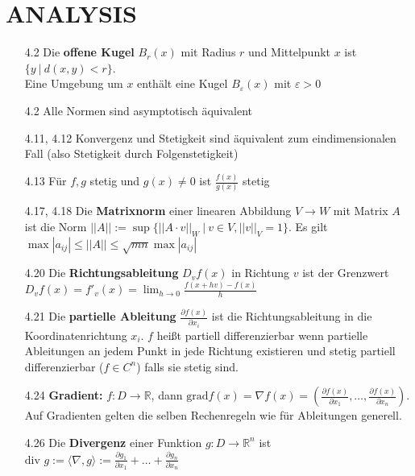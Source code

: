 \documentclass{scrartcl}
\begin{document}
\section*{ANALYSIS}

\begin{itemize}
    \item [4.2] Die \textbf{offene Kugel} $B_r(x)$ mit Radius $r$ und Mittelpunkt $x$ ist $\{y\ |\ d(x,y) < r\}$. \\Eine Umgebung um $x$ enthält eine Kugel $B_\varepsilon(x)$ mit $\varepsilon > 0$

    \item [4.2] Alle Normen sind asymptotisch äquivalent

    \item [4.11, 4.12] Konvergenz und Stetigkeit sind äquivalent zum eindimensionalen Fall (also Stetigkeit durch Folgenstetigkeit)

    \item [4.13] Für $f,g $ stetig und $g(x) \neq 0$ ist $\frac{f(x)}{g(x)}$ stetig

    \item [4.17, 4.18] Die \textbf{Matrixnorm} einer linearen Abbildung $V \to W$ mit Matrix $A$ ist die Norm $||A|| := \sup\{||A \cdot v||_W\ |\ v \in V, ||v||_V = 1\}$. Es gilt $\max |a_{ij}| \leq ||A|| \leq \sqrt{mn}\max |a_{ij}|$

    \item [4.20] Die \textbf{Richtungsableitung} $D_vf(x)$ in Richtung $v$ ist der Grenzwert \\
    $D_vf(x) = f'_v(x) = \lim_{h \to 0} \frac{f(x + hv) - f(x)}{h}$

    \item [4.21] Die \textbf{partielle Ableitung} $\frac{\partial f(x)}{\partial x_i}$ ist die Richtungsableitung in die Koordinatenrichtung $x_i$. $f$ heißt partiell differenzierbar wenn partielle Ableitungen an jedem Punkt in jede Richtung existieren und stetig partiell differenzierbar ($f \in C^n$) falls sie stetig sind.

    \item [4.24] \textbf{Gradient:} $f : D \to \mathbb{R}$, dann $\text{grad} f(x) = \nabla f(x) = \left(\frac{\partial f(x)}{\partial x_1}, \hdots, \frac{\partial f(x)}{\partial x_n} \right)$. Auf Gradienten gelten die selben Rechenregeln wie für Ableitungen generell.

    \item [4.26] Die \textbf{Divergenz} einer Funktion $g: D \to \mathbb{R}^n$ ist $\text{div } g := \langle \nabla,g\rangle := \frac{\partial g_1}{\partial x_1} + \hdots + \frac{\partial g_n}{\partial x_n}$


\end{itemize}
\end{document}
